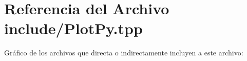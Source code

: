\hypertarget{PlotPy_8tpp}{}\section{Referencia del Archivo include/\+Plot\+Py.tpp}
\label{PlotPy_8tpp}
Gráfico de los archivos que directa o indirectamente incluyen a este archivo\+:

